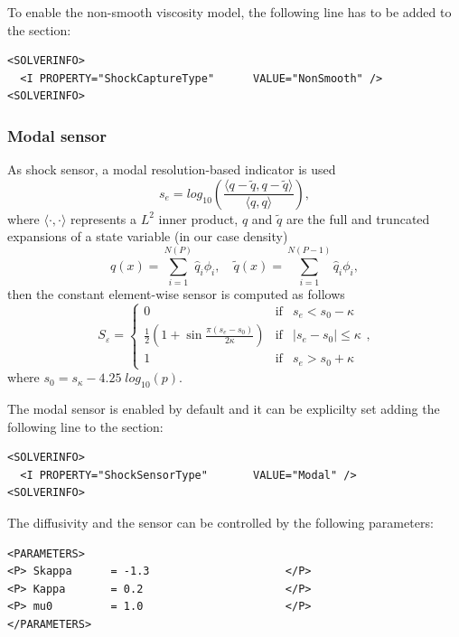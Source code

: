 To enable the non-smooth viscosity model, the following line has to be added to the  section:
\begin{lstlisting}[style=XmlStyle]
<SOLVERINFO>
  <I PROPERTY="ShockCaptureType"      VALUE="NonSmooth" />
<SOLVERINFO>
\end{lstlisting}

\subsubsection{Modal sensor}\label{subsec:modal-sensor}
As shock sensor, a modal resolution-based indicator is used
\begin{equation}\label{eq:sensor}
  s_e = log_{10}\left( \frac{\langle q - \tilde{q}, q - \tilde{q}  \rangle}{\langle q, q \rangle} \right) ,
\end{equation}
where $\langle \cdot, \cdot \rangle$ represents a $L^2$ inner product, $q$ and $\tilde{q}$ are the full and truncated expansions of a state variable (in our case density)
\begin{equation}
  q(x) = \sum_{i=1}^{N(P)} \hat{q}_i \phi_i , \quad \tilde{q}(x) = \sum_{i=1}^{N(P-1)} \hat{q}_i \phi_i ,
\end{equation}
then the constant element-wise sensor is computed as follows
\begin{equation}
   S_\varepsilon
=  \left \{ \begin{array}{lll}
    0 &	 \mbox{if} & s_e<s_0-\kappa \\
    \frac{1}{2}\left(1+\sin{\frac{\pi\left(s_e-s_0\right)}{2\kappa}}\right) &	\mbox{if} &	| s_e - s_0| \le \kappa\\
    1 &	 \mbox{if} & s_e > s_0+\kappa
      \end{array}
    \right.,
\end{equation}
where $s_0 = s_\kappa - 4.25\;log_{10}(p)$.

The modal sensor is enabled by default and it can be explicilty set adding the following line to the  section:
\begin{lstlisting}[style=XmlStyle]
<SOLVERINFO>
  <I PROPERTY="ShockSensorType"       VALUE="Modal" />
<SOLVERINFO>
\end{lstlisting}

The diffusivity and the sensor can be controlled by the following parameters:
\begin{lstlisting}[style=XmlStyle]
<PARAMETERS>
<P> Skappa 	 	= -1.3                     </P>
<P> Kappa 	 	= 0.2                      </P>
<P> mu0 	  	= 1.0                      </P>
</PARAMETERS>
\end{lstlisting}

